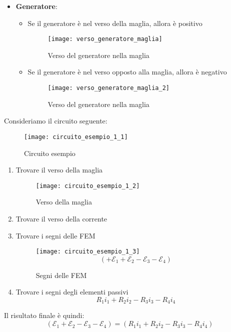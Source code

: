 \documentclass[a4paper]{article}
\begin{document}
\begin{itemize}
\begin{itemize}
      \item \textbf{Generatore}:
        \begin{itemize}
          \item Se il generatore è nel verso della maglia, allora è positivo
            \begin{figure}[H]
              \centering
              \texttt{[image: verso\_generatore\_maglia]}
              \caption{Verso del generatore nella maglia}
            \end{figure}
          \item Se il generatore è nel verso opposto alla maglia, allora è negativo
            \begin{figure}[H]
              \centering
              \texttt{[image: verso\_generatore\_maglia\_2]}
              \caption{Verso del generatore nella maglia}
            \end{figure}
        \end{itemize}
    \end{itemize}
\end{itemize}
\begin{example}
  Consideriamo il circuito seguente:
  \begin{figure}[H]
    \centering
    \texttt{[image: circuito\_esempio\_1\_1]}
    \caption{Circuito esempio}
  \end{figure}
  \begin{enumerate}
    \item Trovare il verso della maglia
      \begin{figure}[H]
        \centering
        \texttt{[image: circuito\_esempio\_1\_2]}
        \caption{Verso della maglia}
      \end{figure}
    \item Trovare il verso della corrente
    \item Trovare i segni delle FEM
      \begin{figure}[H]
        \centering
        \texttt{[image: circuito\_esempio\_1\_3]}
        \[
          \left( +\mathcal{E}_1 + \mathcal{E}_2 - \mathcal{E}_3 - \mathcal{E}_4 \right) 
        \] 
        \caption{Segni delle FEM}
      \end{figure}
    \item Trovare i segni degli elementi passivi
      \[
        R_1 i_1 + R_2 i_2 - R_3 i_3 - R_4 i_4
      \] 
  \end{enumerate}
  Il risultato finale è quindi:
  \[
    \left( \mathcal{E}_1 + \mathcal{E}_2 - \mathcal{E}_3 - \mathcal{E}_4 \right)
    = \left( R_1 i_1 + R_2 i_2 - R_3 i_3 - R_4 i_4 \right)
  \] 
\end{example}
\end{document}
